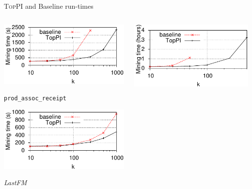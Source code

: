 \documentclass[table]{beamer}
\providecommand{\toppi}{\mbox{\textsc{TopPI}} }
\providecommand{\prodassocreceipt}{\texttt{prod\-\_assoc\-\_receipt} }
\begin{document}
\begin{frame}{\toppi and Baseline run-times}
  \begin{columns}[c]
    \begin{column}[T]{.5\textwidth}
      \includegraphics[width=\textwidth]{../fig/toppi/baseline/tickets2013-s2-t16-timePerK.pdf}\\
      \begin{centering}
        \prodassocreceipt\\
      \end{centering}
      \vspace{1em}
      \includegraphics[width=\textwidth]{../fig/toppi/baseline/lastfm-s2-t16-timePerK.pdf}\\
      \begin{centering}
        {\em LastFM}\\
      \end{centering}
    \end{column}
    \begin{column}[T]{.5\textwidth}
      \includegraphics[width=\textwidth]{../fig/toppi/baseline/tickets2013-perClient-s2-t16-timePerK.pdf}\\

\end{column}
\end{columns}
\end{frame}
\end{document}
